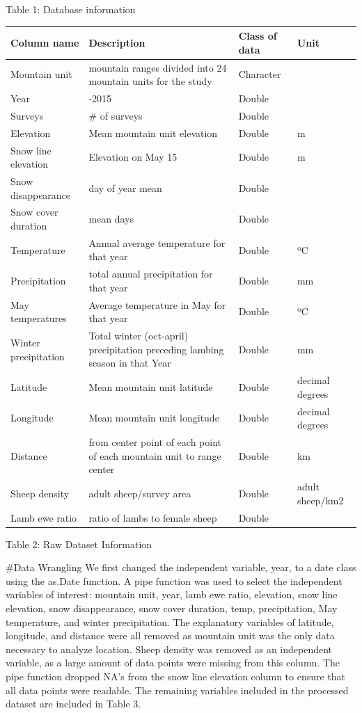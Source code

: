 \documentclass[
  12pt,
]{article}
\begin{document}
Table 1: Database information

\begin{longtable}[]{@{}
  >{\raggedright\arraybackslash}p{}
  >{\raggedright\arraybackslash}p{}
  >{\raggedright\arraybackslash}p{}
  >{\raggedright\arraybackslash}p{}@{}}
\toprule
Column name & Description & Class of data & Unit \\
\midrule
\endhead
Mountain unit & 14 mountain ranges divided into 24 mountain units for
the study & Character & \\
Year & 2000-2015 & Double & \\
Surveys & \# of surveys & Double & \\
Elevation & Mean mountain unit elevation & Double & m \\
Snow line elevation & Elevation on May 15 & Double & m \\
Snow disappearance & day of year mean & Double & \\
Snow cover duration & mean days & Double & \\
Temperature & Annual average temperature for that year & Double & ºC \\
Precipitation & total annual precipitation for that year & Double &
mm \\
May temperatures & Average temperature in May for that year & Double &
ºC \\
Winter precipitation & Total winter (oct-april) precipitation preceding
lambing season in that Year & Double & mm \\
Latitude & Mean mountain unit latitude & Double & decimal degrees \\
Longitude & Mean mountain unit longitude & Double & decimal degrees \\
Distance & from center point of each point of each mountain unit to
range center & Double & km \\
Sheep density & adult sheep/survey area & Double & adult sheep/km2 \\
Lamb ewe ratio & ratio of lambs to female sheep & Double & \\
\bottomrule
\end{longtable}

Table 2: Raw Dataset Information

\#Data Wrangling We first changed the independent variable, year, to a
date class using the as.Date function. A pipe function was used to
select the independent variables of interest: mountain unit, year, lamb
ewe ratio, elevation, snow line elevation, snow disappearance, snow
cover duration, temp, precipitation, May temperature, and winter
precipitation. The explanatory variables of latitude, longitude, and
distance were all removed as mountain unit was the only data necessary
to analyze location. Sheep density was removed as an independent
variable, as a large amount of data points were missing from this
column. The pipe function dropped NA's from the snow line elevation
column to ensure that all data points were readable. The remaining
variables included in the processed dataset are included in Table 3.
\end{document}
